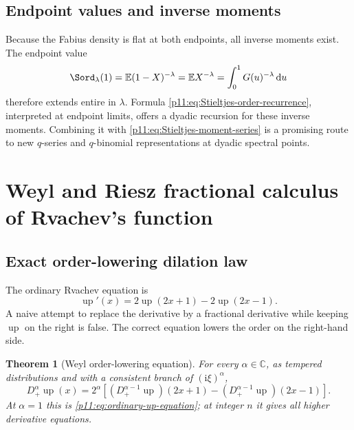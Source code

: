 \documentclass[11pt,oneside]{article}
\newtheorem{theorem}{Theorem}[section]
\theoremstyle{definition}
\theoremstyle{remark}
\newcommand{\Up}{\operatorname{up}}
\newcommand{\E}{\mathbb E}
\newcommand{\C}{\mathbb C}
\newcommand{\dd}{\,\mathrm d}
\newcommand{\ii}{\mathrm i}
\newcommand{\1}{\mathbf 1}
\begin{document}
\subsection{Endpoint values and inverse moments}

Because the Fabius density is flat at both endpoints, all inverse moments
exist.  The endpoint value
\begin{equation}
 \Sord_\lambda(1)
 =\E(1-X)^{-\lambda}
 =\E X^{-\lambda}
 =\int_0^1G(u)^{-\lambda}\dd u
 \label{p11:eq:Stieltjes-endpoint-negative-moment}
\end{equation}
therefore extends entire in $\lambda$.  Formula
\eqref{p11:eq:Stieltjes-order-recurrence}, interpreted at endpoint limits, offers
a dyadic recursion for these inverse moments.  Combining it with
\eqref{p11:eq:Stieltjes-moment-series} is a promising route to new $q$-series and
$q$-binomial representations at dyadic spectral points.

\section{Weyl and Riesz fractional calculus of Rvachev's function}
\label{p11:sec:weyl-riesz}

\subsection{Exact order-lowering dilation law}

The ordinary Rvachev equation \cite{p11:arias1982,p11:Rvachev1990} is
\begin{equation}
 \Up'(x)=2\Up(2x+1)-2\Up(2x-1).
 \label{p11:eq:ordinary-up-equation}
\end{equation}
A naive attempt to replace the derivative by a fractional derivative while
keeping $\Up$ on the right is false.  The correct equation lowers the order on
the right-hand side.

\begin{theorem}[Weyl order-lowering equation]
\label{p11:thm:Weyl-dilation}
For every $\alpha\in\C$, as tempered distributions and with a consistent
branch of $(\ii\xi)^\alpha$,
\begin{equation}
 D_+^\alpha\Up(x)
 =2^\alpha\left[
 (D_+^{\alpha-1}\Up)(2x+1)
 -(D_+^{\alpha-1}\Up)(2x-1)
 \right].
 \label{p11:eq:Weyl-order-lowering}
\end{equation}
At $\alpha=1$ this is \eqref{p11:eq:ordinary-up-equation}; at integer $n$ it gives
all higher derivative equations.
\end{theorem}
\end{document}
